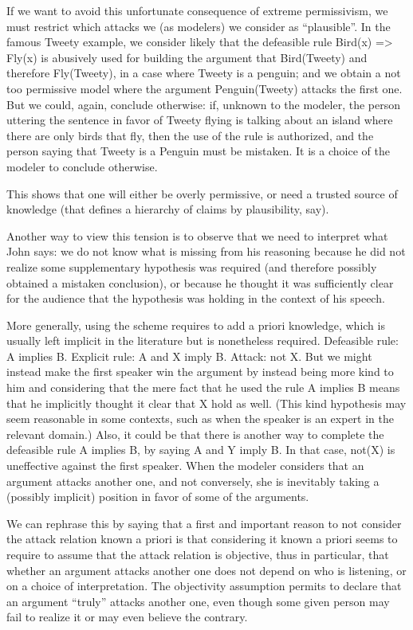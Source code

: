 \documentclass[version=3.21, pagesize, twoside=off, bibliography=totoc, DIV=calc, fontsize=12pt, a4paper, french, english]{scrartcl}
\begin{document}
If we want to avoid this unfortunate consequence of extreme permissivism, we must restrict which attacks we (as modelers) we consider as “plausible”. In the famous Tweety example, we consider likely that the defeasible rule Bird(x) => Fly(x) is abusively used for building the argument that Bird(Tweety) and therefore Fly(Tweety), in a case where Tweety is a penguin; and we obtain a not too permissive model where the argument Penguin(Tweety) attacks the first one. But we could, again, conclude otherwise: if, unknown to the modeler, the person uttering the sentence in favor of Tweety flying is talking about an island where there are only birds that fly, then the use of the rule is authorized, and the person saying that Tweety is a Penguin must be mistaken. It is a choice of the modeler to conclude otherwise.

This shows that one will either be overly permissive, or need a trusted source of knowledge (that defines a hierarchy of claims by plausibility, say).

Another way to view this tension is to observe that we need to interpret what John says: we do not know what is missing from his reasoning because he did not realize some supplementary hypothesis was required (and therefore possibly obtained a mistaken conclusion), or because he thought it was sufficiently clear for the audience that the hypothesis was holding in the context of his speech.

More generally, using the scheme requires to add a priori knowledge, which is usually left implicit in the literature but is nonetheless required. Defeasible rule: A implies B. Explicit rule: A and X imply B. Attack: not X. But we might instead make the first speaker win the argument by instead being more kind to him and considering that the mere fact that he used the rule A implies B means that he implicitly thought it clear that X hold as well. (This kind hypothesis may seem reasonable in some contexts, such as when the speaker is an expert in the relevant domain.) Also, it could be that there is another way to complete the defeasible rule A implies B, by saying A and Y imply B. In that case, not(X) is uneffective against the first speaker. When the modeler considers that an argument attacks another one, and not conversely, she is inevitably taking a (possibly implicit) position in favor of some of the arguments.

We can rephrase this by saying that a first and important reason to not consider the attack relation known a priori is that considering it known a priori seems to require to assume that the attack relation is objective, thus in particular, that whether an argument attacks another one does not depend on who is listening, or on a choice of interpretation. The objectivity assumption permits to declare that an argument “truly” attacks another one, even though some given person may fail to realize it or may even believe the contrary. 
\end{document}
